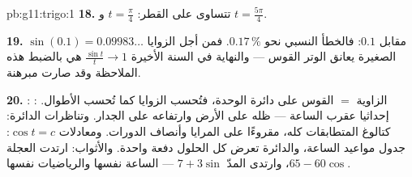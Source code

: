 \begin{solution}{pb:g11:trigo:1}
\textbf{18.} تتساوى   على القطر:
$t = \frac\pi4$ و $t = \frac{5\pi}{4}$.

\textbf{19.} $\sin(0.1) = 0.09983\ldots$ مقابل $0.1$:
فالخطأ النسبي نحو $0.17\,\%$. فمن أجل الزوايا الصغيرة يعانق الوتر
القوس --- والنهاية في السنة الأخيرة
$\frac{\sin t}{t} \to 1$ هي بالضبط هذه الملاحظة وقد صارت
مبرهنة.

\textbf{20.} : الزاوية $=$ القوس على دائرة الوحدة، فتُحسب
الزوايا كما تُحسب الأطوال.  : إحداثيا
عقرب الساعة --- ظله على الأرض وارتفاعه على
الجدار. وتناظرات الدائرة: كتالوغ المتطابقات كله،
مقروءًا على المرايا وأنصاف الدورات. ومعادلات
$\cos t = c$: جدول مواعيد الساعة، والدائرة تعرض
كل الحلول دفعة واحدة. والأثواب: ارتدت العجلة
$65 - 60\cos$، وارتدى المدّ $7 + 3\sin$ --- الساعة نفسها والرياضيات
نفسها.
\end{solution}
